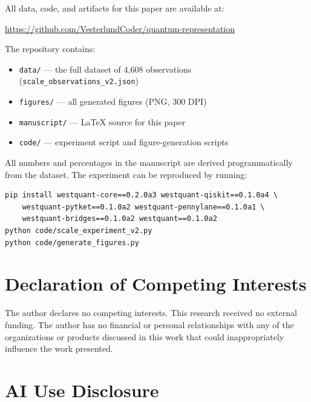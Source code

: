 \documentclass[11pt,a4paper]{article}
\begin{document}
All data, code, and artifacts for this paper are available at:

\begin{center}
\url{https://github.com/VesterlundCoder/quantum-representation}
\end{center}

The repository contains:
\begin{itemize}[noitemsep]
\item \texttt{data/} --- the full dataset of 4{,}608 observations (\texttt{scale\_observations\_v2.json})
\item \texttt{figures/} --- all generated figures (PNG, 300 DPI)
\item \texttt{manuscript/} --- LaTeX source for this paper
\item \texttt{code/} --- experiment script and figure-generation scripts
\end{itemize}

All numbers and percentages in the manuscript are derived programmatically from the dataset. The experiment can be reproduced by running:
\begin{verbatim}
pip install westquant-core==0.2.0a3 westquant-qiskit==0.1.0a4 \
    westquant-pytket==0.1.0a2 westquant-pennylane==0.1.0a1 \
    westquant-bridges==0.1.0a2 westquant==0.1.0a2
python code/scale_experiment_v2.py
python code/generate_figures.py
\end{verbatim}


\section*{Declaration of Competing Interests}

The author declares no competing interests. This research received no external funding. The author has no financial or personal relationships with any of the organizations or products discussed in this work that could inappropriately influence the work presented.


\section*{AI Use Disclosure}
\end{document}
